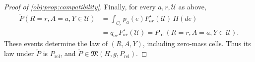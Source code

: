 \begin{proof}[Proof of \cref{obj:prop:compatibility}]
Finally, for every \(a,r,\mathcal U\) as above,
\[
\begin{aligned}
\widetilde P(R=r,A=a,Y\in\mathcal U)
&=\int_{C_r}p_a(e)F^\star_{ar}(\mathcal U)\,H(de)\\
&=q_{ar}F^\star_{ar}(\mathcal U)
=P_{\mathrm{rel}}(R=r,A=a,Y\in\mathcal U).
\end{aligned}
\]
These events determine the law of \((R,A,Y)\), including zero-mass cells. Thus its law under \(\widetilde P\) is \(P_{\mathrm{rel}}\), and \(\widetilde P\in\mathfrak M(H,g,P_{\mathrm{rel}})\).
\end{proof}
